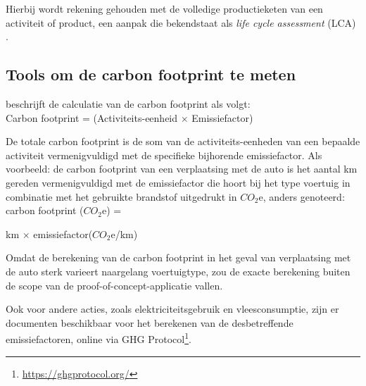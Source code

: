 \documentclass{hogent-article}
\begin{document}
    Hierbij wordt rekening gehouden met de volledige productieketen van een activiteit of product, een aanpak die bekendstaat als \textit{life cycle assessment} (LCA) \autocite{Wright2011}.
        

    
    \subsection{Tools om de carbon footprint te meten}
    \label{ssec:tools}
    
    \textcite{GHGProtocol2013} beschrijft de calculatie van de carbon footprint als volgt: \\
    
    Carbon footprint = \sum(Activiteits-eenheid $\times$ Emissiefactor)
    
    De totale carbon footprint is de som van de activiteits-eenheden van een bepaalde activiteit vermenigvuldigd met de specifieke bijhorende emissiefactor. Als voorbeeld:
    de carbon footprint van een verplaatsing met de auto is het aantal km gereden vermenigvuldigd met de emissiefactor die hoort bij het type voertuig in combinatie met het gebruikte brandstof uitgedrukt in $CO_2$e, anders genoteerd: \\
    
    carbon footprint ($CO_2$e) = 
    \begin{flushright}
        km  $\times$ emissiefactor($CO_2$e/km)
    \end{flushright}
    
    Omdat de berekening van de carbon footprint in het geval van verplaatsing met de auto sterk varieert naargelang voertuigtype, zou de exacte berekening buiten de scope van de proof\--of\--concept\--applicatie vallen.
    
    Ook voor andere acties, zoals elektriciteitsgebruik en vleesconsumptie, zijn er documenten beschikbaar voor het berekenen van de desbetreffende emissiefactoren, online via GHG Protocol\footnote{\href{https://ghgprotocol.org/}{https://ghgprotocol.org/}}.
    
\end{document}
